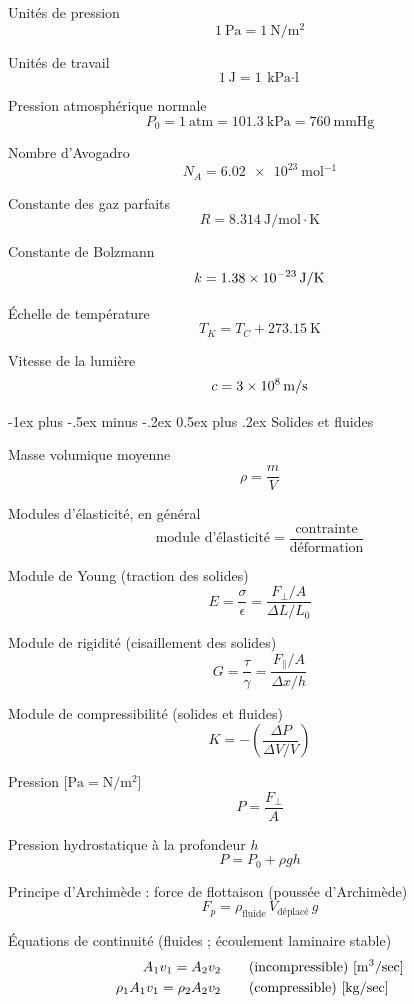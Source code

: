 \documentclass[10pt,landscape]{article}
\makeatletter
\renewcommand{\section}{\@startsection{section}{1}{0mm}%
                                {-1ex plus -.5ex minus -.2ex}%
                                {0.5ex plus .2ex}%
                                {\normalfont\large\bfseries}}
\makeatother
\begin{document}
\begin{multicols}{3}
Unités de pression
\[ \SI{1}{\pascal} = \SI{1}{\newton/\meter^2} \]

Unités de travail
\[ \SI{1}{\joule} = \SI{1}{\kilo\pascal\cdot\litre} \]

Pression atmosphérique normale
\[ P_0 = \SI{1}{\text{atm}} = \SI{101,3}{\kilo\pascal}
= \SI{760}{\mmHg} \]

Nombre d'Avogadro
\[ N_A = \SI{6,02e23}{\mol^{-1}}\]

Constante des gaz parfaits
\[ R = \SI{8,314}{\joule/\mole\cdot\kelvin} \]

Constante de Bolzmann
\[ k = \SI{1,38E-23}{\joule/\kelvin} \]

Échelle de température
\[ T_K = T_C + \SI{273,15}{\kelvin} \]

Vitesse de la lumière
\[ c = \SI{3E8}{\meter/\second}  \]

\hrulefill


\section{Solides et fluides}

Masse volumique moyenne
\[ \rho = \frac{m}{V} \]

Modules d'élasticité, en général
\[ \text{module d'élasticité} = \frac{\text{contrainte}}{\text{déformation}} \]

Module de Young (traction des solides)
\[ E = \frac{\sigma}{\epsilon} 
= \frac{{F_\perp}/{A}}{{\Delta L}/{L_0}} 
\]

Module de rigidité (cisaillement des solides)
\[ G = \frac{\tau}{\gamma} 
= \frac{F_\parallel/A}{{\Delta x}/{h}} 
\]

Module de compressibilité (solides et fluides)
\[ K = - \left(\frac{\Delta P}{\Delta V / V} \right)\]

Pression [$\si{\pascal} = \si{\newton/\metre^2}$]
\[ P = \frac{F_\perp}{A} \]

Pression hydrostatique à la profondeur $h$
\[ P = P_0 + \rho gh \]

Principe d'Archimède : force de flottaison (poussée d'Archimède)
\[ F_p = \rho_\text{fluide} \, V_\text{déplacé} \, g \]

Équations de continuité (fluides ; écoulement laminaire stable)
\begin{align*}
	A_1 v_1 = A_2 v_2 \qquad &\text{(incompressible) [\si{\meter^3/\sec]}} \\
	\rho_1 A_1 v_1 = \rho_2 A_2 v_2 \qquad &\text{(compressible) [\si{\kilogram/\sec}]}
\end{align*}


\end{multicols}
\end{document}
